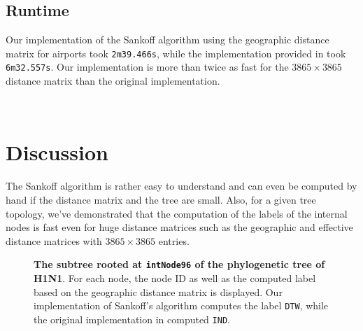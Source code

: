 \documentclass{article}
\begin{document}
\subsection{Runtime}
Our implementation of the Sankoff algorithm using the geographic distance
matrix for airports took \texttt{2m39.466s}, while the implementation provided in
\cite{reimeringPhylogeographicReconstructionUsing2020} took \texttt{6m32.557s}.
Our implementation is more than twice as fast for the $3865 \times 3865$
distance matrix than the original implementation.

\ \\
\section{Discussion}
The Sankoff algorithm is rather easy to understand and can even be computed by
hand if the distance matrix and the tree are small. Also, for a given tree
topology, we've demonstrated that the computation of the labels of the internal
nodes is fast even for huge distance matrices such as the geographic and
effective distance matrices with $3865 \times 3865$ entries.

\begin{figure}[h]
    \centering
    \caption{\textbf{The subtree rooted at \texttt{intNode96} of the
    phylogenetic tree of H1N1}. For each node, the node ID as well as the computed
    label based on the geographic distance matrix is displayed. Our implementation of Sankoff's algorithm computes the
    label \texttt{DTW}, while the original implementation in
    \cite{reimeringPhylogeographicReconstructionUsing2020} computed \texttt{IND}.}
    \label{fig:subtree}
  \end{figure}
\end{document}
